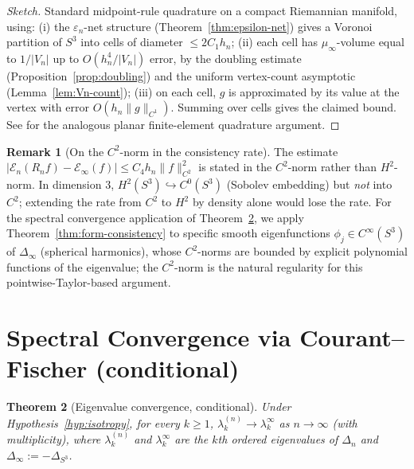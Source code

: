 \documentclass[11pt, a4paper]{amsart}
\newtheorem{theorem}{Theorem}[section]
\theoremstyle{definition}
\newtheorem{remark}[theorem]{Remark}
\begin{document}
\begin{proof}[Sketch]
Standard midpoint-rule quadrature on a compact Riemannian
manifold, using: (i) the $\varepsilon_n$-net structure
(Theorem~\ref{thm:epsilon-net}) gives a Voronoi partition of
$S^3$ into cells of diameter $\leq 2 C_1 h_n$; (ii) each cell
has $\mu_\infty$-volume equal to $1/|V_n|$ up to $O(h_n^4/|V_n|)$
error, by the doubling estimate
(Proposition~\ref{prop:doubling}) and the uniform vertex-count
asymptotic (Lemma~\ref{lem:Vn-count}); (iii) on each cell, $g$
is approximated by its value at the vertex with error $O(h_n
\|g\|_{C^1})$. Summing over cells gives the claimed bound. See
\cite[Ch.~4]{BrennerScottFEM} for the analogous planar
finite-element quadrature argument.
\end{proof}

\begin{remark}[On the $C^2$-norm in the consistency rate]
\label{rmk:c2-norm}
The estimate $|\mathcal E_n(R_n f) - \mathcal E_\infty(f)| \leq
C_4 h_n \|f\|_{C^2}^2$ is stated in the $C^2$-norm rather than
$H^2$-norm. In dimension $3$, $H^2(S^3) \hookrightarrow C^0(S^3)$
(Sobolev embedding) but \emph{not} into $C^2$; extending the
rate from $C^2$ to $H^2$ by density alone would lose the rate.
For the spectral convergence application of
Theorem~\ref{thm:spectral-convergence}, we apply
Theorem~\ref{thm:form-consistency} to specific smooth
eigenfunctions $\phi_j \in C^\infty(S^3)$ of $\Delta_\infty$
(spherical harmonics), whose $C^2$-norms are bounded by explicit
polynomial functions of the eigenvalue; the $C^2$-norm is the
natural regularity for this pointwise-Taylor-based argument.
\end{remark}


\section{Spectral Convergence via Courant--Fischer (conditional)}
\label{sec:spectral}

\begin{theorem}[Eigenvalue convergence, conditional]
\label{thm:spectral-convergence}
Under Hypothesis~\ref{hyp:isotropy}, for every $k \geq 1$,
$\lambda_k^{(n)} \to \lambda_k^\infty$ as $n \to \infty$ (with
multiplicity), where $\lambda_k^{(n)}$ and $\lambda_k^\infty$
are the $k$th ordered eigenvalues of $\Delta_n$ and
$\Delta_\infty := -\Delta_{S^3}$.
\end{theorem}
\end{document}
